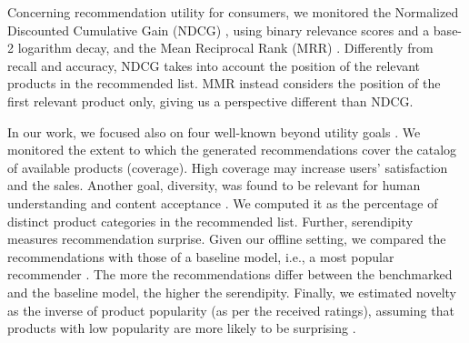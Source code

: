 \documentclass[runningheads]{llncs}
\begin{document}
Concerning recommendation utility for consumers, we monitored the Normalized Discounted Cumulative Gain (NDCG) \cite{WangWLHL13}, 
using binary relevance scores and a base-2 logarithm decay, 
and the Mean Reciprocal Rank (MRR) \cite{Craswell2009}. 
Differently from recall and accuracy, NDCG takes into account the position of the relevant products in the recommended list. 
MMR instead considers the position of the first relevant product only, giving us a perspective different than NDCG.

In our work, we focused also on four well-known beyond utility goals \cite{10.1145/2926720}. 
We monitored the extent to which the generated recommendations cover the catalog of available products (coverage). 
High coverage may increase users' satisfaction and the sales. 
Another goal, diversity, was found to be relevant for human understanding \cite{GEDIKLI2014367} and content acceptance \cite{10.1145/290941.291025}. 
We computed it as the percentage of distinct product categories in the recommended list. 
Further, serendipity measures recommendation surprise\cite{10.1145/963770.963772}. 
Given our offline setting, we compared the recommendations with those of a baseline model, i.e., a most popular recommender \cite{10.1007/978-3-540-78197-4_5}.  
The more the recommendations differ between the benchmarked and the baseline model, the higher the serendipity. 
Finally, we estimated novelty as the inverse of product popularity (as per the received ratings), assuming that products with low popularity are more likely to be surprising \cite{Zhou2010SolvingTA}. 
\end{document}
